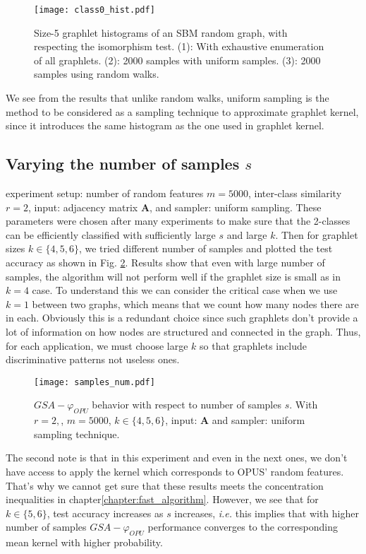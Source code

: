 \begin{figure}[H]
\centering
\texttt{[image: class0\_hist.pdf]}
\caption[Graphlet histograms of uniform and random walk sampling techniques]{Size-5 graphlet histograms of an SBM random graph, with respecting the isomorphism test. (1): With exhaustive enumeration of all graphlets. (2): 2000 samples with uniform samples. (3): 2000 samples using random walks. }
\label{fig:graphlet_hist}
\end{figure}
We see from the results that unlike random walks, uniform sampling is the method to be considered as a sampling technique to approximate graphlet kernel, since it introduces the same histogram as the one used in graphlet kernel. 
\subsection{Varying the number of samples $s$}
experiment setup: number of random features $m=5000$, inter-class similarity $r=2$, input: adjacency matrix $\mathbf{A}$, and sampler: uniform sampling. These parameters were chosen after many experiments to make sure that the 2-classes can be efficiently classified with sufficiently large $s$ and large $k$. Then for graphlet sizes $k\in\{4,5,6\}$, we tried different number of samples and plotted the test accuracy as shown in Fig. \ref{fig:varying_samples_num}.\newline
Results show that even with large number of samples, the algorithm will not perform well if the graphlet size is small as in $k=4$ case. To understand this we can consider the critical case when we use $k=1$ between two graphs, which means that we count how many nodes there are in each. Obviously this is a redundant choice since such graphlets don't provide a lot of information on how nodes are structured and connected in the graph. Thus, for each application, we must choose large $k$ so that graphlets include discriminative patterns not useless ones.
\begin{figure}[H]
\centering
\texttt{[image: samples\_num.pdf]}
\caption[$GSA-\varphi_{OPU}$ behavior with respect to number of samples $s$]{$GSA-\varphi_{OPU}$ behavior with respect to number of samples $s$. With $r=2,$, $m=5000$, $k\in\{4,5,6\}$, input: $\mathbf{A}$ and sampler: uniform sampling technique.}
\label{fig:varying_samples_num}
\end{figure}
The second note is that in this experiment and even in the next ones, we don't have access to apply the kernel which corresponds to OPUS' random features. That's why we cannot get sure that these results meets the concentration inequalities in chapter\ref{chapter:fast_algorithm}. However, we see that for $k\in\{5,6\}$, test accuracy increases as  $s$ increases, \emph{i.e.} this implies that with higher number of samples $GSA-\varphi_{OPU}$ performance converges to the corresponding mean kernel with higher probability.





